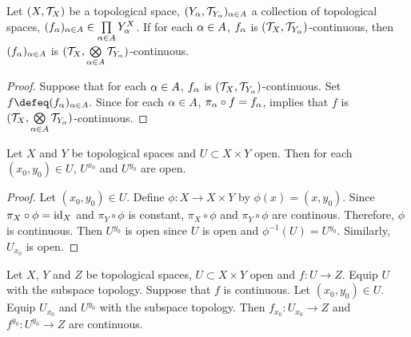 \documentclass{book}
\begin{document}
	\begin{ex} 
		Let $(X, \mathcal{T}_X)$ be a topological space, $(Y_{\alpha}, \mathcal{T}_{Y_{\alpha}})_{\alpha \in A}$ a collection of topological spaces, $(f_{\alpha})_{\alpha \in A} \in \prod\limits_{\alpha \in A} Y_{\alpha}^X$. If for each $\alpha \in A$, $f_{\alpha}$ is $(\mathcal{T}_X, \mathcal{T}_{Y_{\alpha}})$-continuous, then $(f_{\alpha})_{\alpha \in A}$ is $(\mathcal{T}_X, \bigotimes\limits_{\alpha \in A} \mathcal{T}_{Y_{\alpha}})$-continuous.
	\end{ex}

	\begin{proof}
		Suppose that for each $\alpha \in A$, $f_{\alpha}$ is $(\mathcal{T}_X, \mathcal{T}_{Y_{\alpha}})$-continuous. Set $f \defeq (f_{\al})_{\al \in A}$. Since for each $\alpha \in A$, $\pi_{\alpha} \circ f = f_{\alpha}$,  implies that $f$ is $(\mathcal{T}_X, \bigotimes\limits_{\alpha \in A} \mathcal{T}_{Y_{\alpha}})$-continuous.
	\end{proof}




	\begin{defn}
	\end{defn}
	
	\begin{ex} 
		Let $X$ and $Y$ be topological spaces and $U \subset X \times Y$ open. Then for each $(x_0,  y_0) \in U$, $U^{x_0}$ and $U^{y_0}$ are open.
	\end{ex}
	
	\begin{proof}
		Let $(x_0, y_0) \in U$. Define $\phi: X \rightarrow X \times Y$ by $\phi(x) = (x, y_0)$. Since $\pi_X \circ \phi = \operatorname{id}_X$ and $\pi_Y \circ \phi$ is constant, $\pi_X \circ \phi$ and $\pi_Y \circ \phi$ are continous. Therefore, $\phi$ is continuous. Then $U^{y_0}$ is open since $U$ is open and $\phi^{-1}(U) = U^{y_0}$. Similarly, $U_{x_0}$ is open.
	\end{proof}

	\begin{ex} 
		Let $X$, $Y$ and $Z$ be topological spaces, $U \subset X \times Y$ open and $f: U \rightarrow Z$. Equip $U$ with the subspace topology. Suppose that $f$ is continuous. Let $(x_0, y_0) \in U$. Equip $U_{x_0}$ and $U^{y_0}$ with the subspace topology. Then $f_{x_0}:U_{x_0} \rightarrow Z$ and $f^{y_0}: U^{y_0} \rightarrow Z$ are continuous.
	\end{ex}
\end{document}
